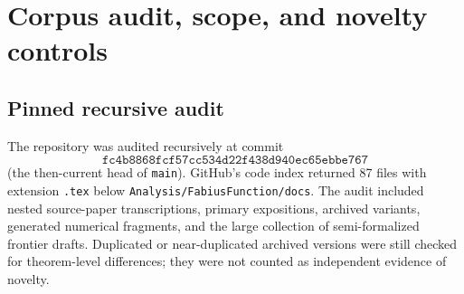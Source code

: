 \documentclass[11pt]{article}
\numberwithin{equation}{section}
\theoremstyle{definition}
\theoremstyle{remark}
\begin{document}
\begin{abstract}
All claims labeled theorem, proposition, lemma, or corollary are proved here.  Claims labeled conjecture or problem are deliberately unproved.  The arrival-time novelty screen was incomplete: the pinned corpus already contained overlapping Laguerre--P\'olya, PF$_\infty$, shifted-Jensen, zero-count, and sign material.  Accordingly, ``new'' below describes report-local deductions and packaging after the corrected crosswalk in \cref{sec:audit}; it is neither a claim of absence from the repository nor a claim of exhaustive priority over the literature.
\end{abstract}

\tableofcontents
\newpage

\section{Corpus audit, scope, and novelty controls}\label{sec:audit}

\subsection{Pinned recursive audit}

The repository was audited recursively at commit
\[
 \texttt{fc4b8868fcf57cc534d22f438d940ec65ebbe767}
\]
(the then-current head of \texttt{main}).  GitHub's code index returned 87 files with extension \texttt{.tex} below \texttt{Analysis/FabiusFunction/docs}.  The audit included nested source-paper transcriptions, primary expositions, archived variants, generated numerical fragments, and the large collection of semi-formalized frontier drafts.  Duplicated or near-duplicated archived versions were still checked for theorem-level differences; they were not counted as independent evidence of novelty.
\end{document}
